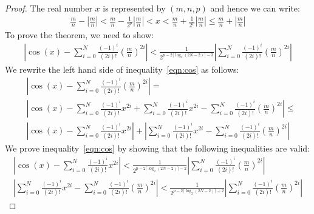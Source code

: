 \documentclass{article}
\numberwithin{mytheorem}{section}
\newcommand{\taylorcos}[3] {\sum_{i=#1}^{#2}\frac{(-1)^i}{(2i)!}{#3}^{2i}}
\begin{document}
\begin{proof}
The real number $x$ is represented by $(m,n,p)$ and hence we can write:
\begin{align}
\frac{m}{n}-|\frac{m}{n}|<\frac{m}{n}-\frac{1}{2^p}|\frac{m}{n}|<x<\frac{m}{n}+\frac{1}{2^p}|\frac{m}{n}|\leq \frac{m}{n}+|\frac{m}{n}|\label{eqn:cos_bound}
\end{align}
To prove the theorem, we need to show:
\begin{align}
|\cos(x)-\taylorcos{0}{N}{(\frac{m}{n})}|<\frac{1}{2^{p-2\lceil\log_2(2N-2)\rceil -3}}|\taylorcos{0}{N}{(\frac{m}{n})}|\label{eqn:cos}
\end{align}
We rewrite the left hand side of inequality~\eqref{eqn:cos} as follows:
\begin{align*}
&|\cos(x)-\taylorcos{0}{N}{(\frac{m}{n})}|=\\
&|\cos(x)-\taylorcos{0}{N}{x}+\taylorcos{0}{N}{x}-\taylorcos{0}{N}{(\frac{m}{n})}|\leq\\
&|\cos(x)-\taylorcos{0}{N}{x}|+|\taylorcos{0}{N}{x}-\taylorcos{0}{N}{(\frac{m}{n})}|
\end{align*}
We prove inequality~\eqref{eqn:cos} by showing that the following inequalities are valid:
\begin{gather}
|\cos(x)-\taylorcos{0}{N}{x}|<\frac{1}{2^{p-2\lceil\log_2(2N-2)\rceil -2}}|\taylorcos{0}{N}{(\frac{m}{n})}|\label{eqn:cos_part_1}\\
|\taylorcos{0}{N}{x}-\taylorcos{0}{N}{(\frac{m}{n})}|<\frac{1}{2^{p-2\lceil\log_2(2N-2)\rceil -2}}|\taylorcos{0}{N}{(\frac{m}{n})}|\label{eqn:cos_part_2}
\end{gather}


\end{proof}
\end{document}
